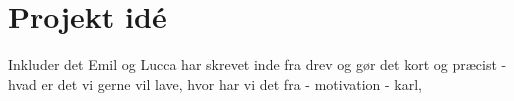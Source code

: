 \section{Projekt idé}
\label{ProjektIde}
%
Inkluder det Emil og Lucca har skrevet inde fra drev og gør det kort og præcist - hvad er det vi gerne vil lave, hvor har vi det fra - motivation - karl,